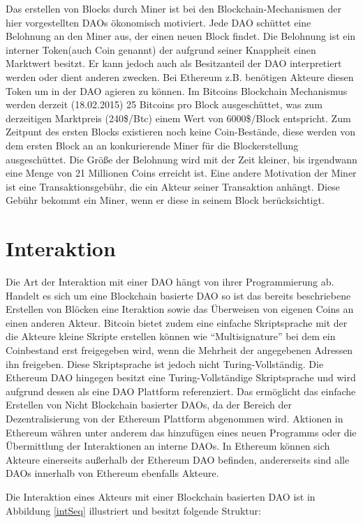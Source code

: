 \documentclass[a4paper,12pt]{report}
\begin{document}
Das erstellen von Blocks durch Miner ist bei den Blockchain-Mechanismen der hier vorgestellten DAOs ökonomisch motiviert. Jede DAO schüttet eine Belohnung an den Miner aus, der einen neuen Block findet. Die Belohnung ist ein interner Token(auch Coin genannt) der aufgrund seiner Knappheit einen Marktwert besitzt. Er kann jedoch auch als Besitzanteil der DAO interpretiert werden oder dient anderen zwecken. Bei Ethereum z.B. benötigen Akteure diesen Token um in der DAO agieren zu können. Im Bitcoins Blockchain Mechanismus werden derzeit (18.02.2015) 25 Bitcoins pro Block ausgeschüttet, was zum derzeitigen Marktpreis (240\$/Btc) einem Wert von 6000\$/Block entspricht.  
Zum Zeitpunt des ersten Blocks existieren noch keine Coin-Bestände, diese werden von dem ersten Block an an konkurierende Miner für die Blockerstellung ausgeschüttet. Die Größe der Belohnung wird mit der Zeit kleiner, bis irgendwann eine Menge von 21 Millionen Coins erreicht ist. Eine andere Motivation der Miner ist eine Transaktionsgebühr, die ein Akteur seiner Transaktion anhängt. Diese Gebühr bekommt ein Miner, wenn er diese in seinem Block berücksichtigt.

\section{Interaktion}
\label{interaction}
Die Art der Interaktion mit einer DAO hängt von ihrer Programmierung ab. Handelt es sich um eine Blockchain basierte DAO so ist das bereits beschriebene Erstellen von Blöcken eine Iteraktion sowie das Überweisen von eigenen Coins an einen anderen Akteur. Bitcoin bietet zudem eine einfache Skriptsprache mit der die Akteure kleine Skripte erstellen können wie ``Multisignature'' bei dem ein Coinbestand erst freigegeben wird, wenn die Mehrheit der angegebenen Adressen ihn freigeben. Diese Skriptsprache ist jedoch nicht Turing-Vollständig. Die Ethereum DAO hingegen besitzt eine Turing-Vollständige Skriptsprache und wird aufgrund dessen als eine DAO Plattform referenziert. Das ermöglicht das einfache Erstellen von Nicht Blockchain basierter DAOs, da der Bereich der Dezentralisierung von der Ethereum Plattform abgenommen wird. Aktionen in Ethereum währen unter anderem das hinzufügen eines neuen Programms oder die Übermittlung der Interaktionen an interne DAOs. In Ethereum können sich Akteure einerseits außerhalb der Ethereum DAO befinden, andererseits sind alle DAOs innerhalb von Ethereum ebenfalls Akteure.

Die Interaktion eines Akteurs mit einer Blockchain basierten DAO ist in Abbildung \ref{intSeq} illustriert und besitzt folgende Struktur:
\end{document}
